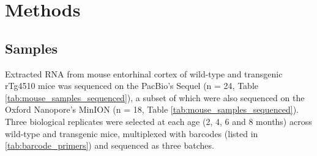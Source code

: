 

 

\section{Methods}

\subsection{Samples}
Extracted RNA from mouse entorhinal cortex of wild-type and transgenic rTg4510 mice was sequenced on the PacBio's Sequel (n = 24, Table \ref{tab:mouse_samples_sequenced}), a subset of which were also sequenced on the Oxford Nanopore's MinION (n = 18, Table \ref{tab:mouse_samples_sequenced}). Three biological replicates were selected at each age (2, 4, 6 and 8 months) across wild-type and transgenic mice, multiplexed with barcodes (listed in \cref{tab:barcode_primers}) and sequenced as three batches.

